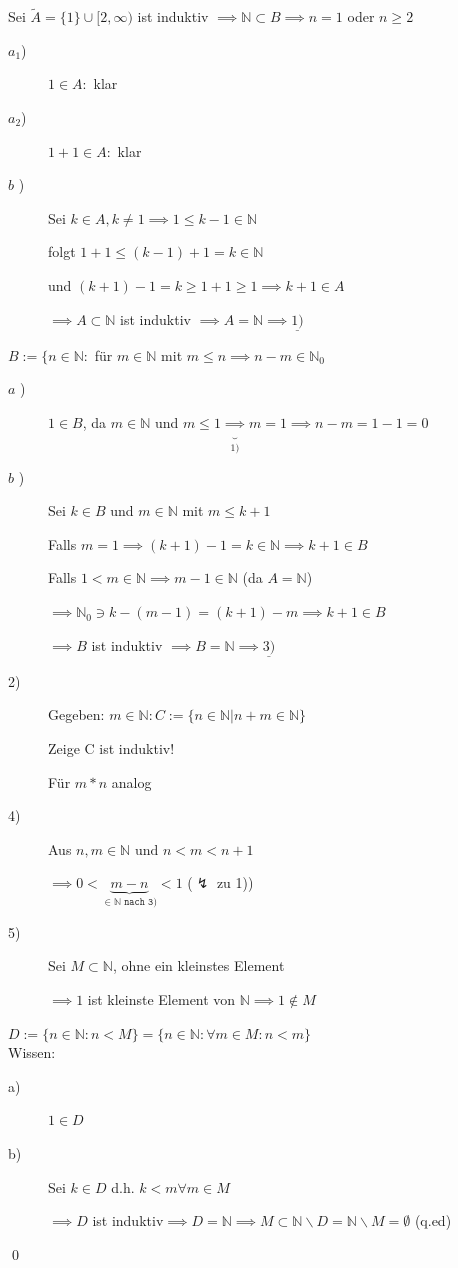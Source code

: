 \documentclass[fleqn]{scrartcl}
\renewenvironment{proof}{{\bfseries Beweis }}{\qed}
\begin{document}
\begin{proof}
{Sei $\tilde{A} = \{1\} \cup [2, \infty)$ ist induktiv $\implies \mathbb{N} \subset B \implies n = 1$ oder $n \geq 2$}
\begin{description}
\item[$a_1$)] $1 \in A:$ klar
\item[$a_2$)] $1 + 1 \in A:$ klar
\item[$b$  )] Sei $k \in A, k \neq 1 \implies 1 \leq k - 1 \in \mathbb{N}$

folgt $1 + 1 \leq (k - 1) + 1 = k \in \mathbb{N}$

und $(k + 1) - 1 = k \geq 1 + 1 \geq 1 \implies k + 1 \in A$

$\implies A \subset \mathbb{N}$ ist induktiv $\implies A = \mathbb{N} 
\implies \underline{1)}$
\end{description}
$B := \{n \in \mathbb{N}:$ für $m \in \mathbb{N}$ mit $m \leq n \implies n-m \in \mathbb{N}_0$
\begin{description}
\item[$a$  )] $1 \in B$, da $m \in \mathbb{N}$ und $m \leq 1 \underbrace{\implies}_{1)} m = 1 \implies n-m = 1-1 = 0$
\item[$b$  )] Sei $k \in B$ und $m \in \mathbb{N}$ mit $m \leq k + 1$ 

Falls $m = 1 \implies (k + 1) - 1 = k \in \mathbb{N} \implies k + 1 \in B$

Falls $1 < m \in \mathbb{N} \implies m - 1 \in \mathbb{N}$ (da $A = \mathbb{N}$)

$\implies \mathbb{N}_0 \ni k - (m - 1) = (k + 1) - m \implies k + 1 \in B$

$\implies B$ ist induktiv $\implies B = \mathbb{N} \implies \underline{3)}$
\item[2)] Gegeben: $m \in \mathbb{N}: C:=\{n \in \mathbb{N} | n + m \in \mathbb{N}\}$

Zeige C ist induktiv!

Für $m * n $ analog

\item[4)] Aus $n,m \in \mathbb{N} \text{ und } n < m < n + 1$

$\implies 0 < \underbrace{m-n}_{\in \mathbb{N}\texttt{ nach 3)}}<1$ ($\lightning$ zu 1))

\item[5)] Sei $M \subset \mathbb{N}$, ohne ein kleinstes Element

$\implies 1$ ist kleinste Element von $\mathbb{N} \implies 1 \notin M$

\end{description}
$D:=\{n \in \mathbb{N}: n < M\} = \{n \in \mathbb{N}: \forall m \in M: n < m\}$\\Wissen:
\begin{description}

\item[a)] $1 \in D$
\item[b)] Sei $k \in D$ d.h. $k < m \forall m \in M$

$\implies D$ ist induktiv$\implies D = \mathbb{N} \implies M \subset \mathbb{N} \backslash D = \mathbb{N} \backslash M = \emptyset$ (q.ed)
\end{description}
\end{proof}
\end{document}
